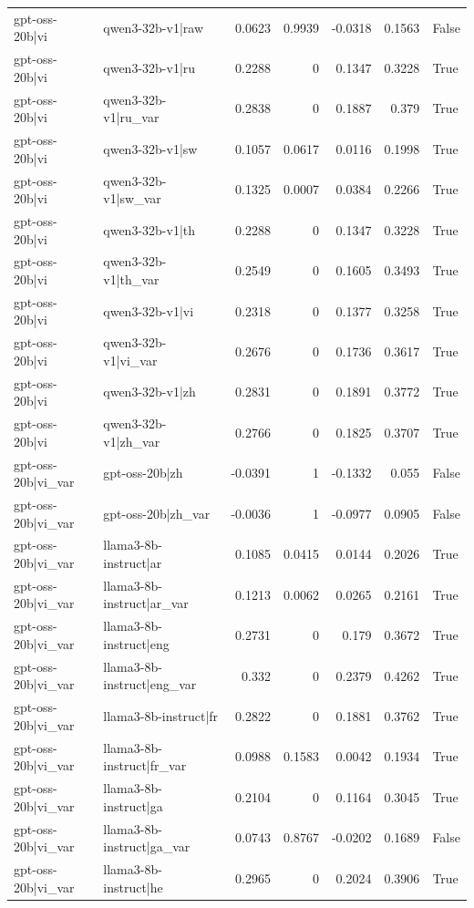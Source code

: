 \begin{table}
\begin{tabular}{l l r r r r l}
gpt-oss-20b|vi & qwen3-32b-v1|raw & 0.0623 & 0.9939 & -0.0318 & 0.1563 & False \\
gpt-oss-20b|vi & qwen3-32b-v1|ru & 0.2288 & 0 & 0.1347 & 0.3228 & True \\
gpt-oss-20b|vi & qwen3-32b-v1|ru_var & 0.2838 & 0 & 0.1887 & 0.379 & True \\
gpt-oss-20b|vi & qwen3-32b-v1|sw & 0.1057 & 0.0617 & 0.0116 & 0.1998 & True \\
gpt-oss-20b|vi & qwen3-32b-v1|sw_var & 0.1325 & 0.0007 & 0.0384 & 0.2266 & True \\
gpt-oss-20b|vi & qwen3-32b-v1|th & 0.2288 & 0 & 0.1347 & 0.3228 & True \\
gpt-oss-20b|vi & qwen3-32b-v1|th_var & 0.2549 & 0 & 0.1605 & 0.3493 & True \\
gpt-oss-20b|vi & qwen3-32b-v1|vi & 0.2318 & 0 & 0.1377 & 0.3258 & True \\
gpt-oss-20b|vi & qwen3-32b-v1|vi_var & 0.2676 & 0 & 0.1736 & 0.3617 & True \\
gpt-oss-20b|vi & qwen3-32b-v1|zh & 0.2831 & 0 & 0.1891 & 0.3772 & True \\
gpt-oss-20b|vi & qwen3-32b-v1|zh_var & 0.2766 & 0 & 0.1825 & 0.3707 & True \\
gpt-oss-20b|vi_var & gpt-oss-20b|zh & -0.0391 & 1 & -0.1332 & 0.055 & False \\
gpt-oss-20b|vi_var & gpt-oss-20b|zh_var & -0.0036 & 1 & -0.0977 & 0.0905 & False \\
gpt-oss-20b|vi_var & llama3-8b-instruct|ar & 0.1085 & 0.0415 & 0.0144 & 0.2026 & True \\
gpt-oss-20b|vi_var & llama3-8b-instruct|ar_var & 0.1213 & 0.0062 & 0.0265 & 0.2161 & True \\
gpt-oss-20b|vi_var & llama3-8b-instruct|eng & 0.2731 & 0 & 0.179 & 0.3672 & True \\
gpt-oss-20b|vi_var & llama3-8b-instruct|eng_var & 0.332 & 0 & 0.2379 & 0.4262 & True \\
gpt-oss-20b|vi_var & llama3-8b-instruct|fr & 0.2822 & 0 & 0.1881 & 0.3762 & True \\
gpt-oss-20b|vi_var & llama3-8b-instruct|fr_var & 0.0988 & 0.1583 & 0.0042 & 0.1934 & True \\
gpt-oss-20b|vi_var & llama3-8b-instruct|ga & 0.2104 & 0 & 0.1164 & 0.3045 & True \\
gpt-oss-20b|vi_var & llama3-8b-instruct|ga_var & 0.0743 & 0.8767 & -0.0202 & 0.1689 & False \\
gpt-oss-20b|vi_var & llama3-8b-instruct|he & 0.2965 & 0 & 0.2024 & 0.3906 & True \\

\end{tabular}
\end{table}
